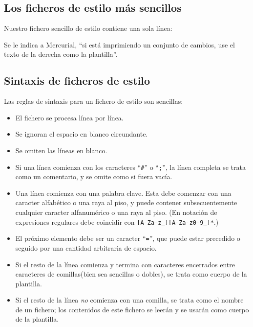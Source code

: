 {{\subsection{Los ficheros de estilo más sencillos}

Nuestro fichero sencillo de estilo contiene una sola línea:


Se le indica a Mercurial, ``si está imprimiendo un conjunto de
cambios, use el texto de la derecha como la plantilla''.

\subsection{Sintaxis de ficheros de estilo}

Las reglas de sintaxis para un fichero de estilo son sencillas:

\begin{itemize}
\item El fichero se procesa línea por línea.

\item Se ignoran el espacio en blanco circundante.

\item Se omiten las líneas en blanco.

\item Si una línea comienza con los caracteres ``\texttt{\#}'' o
  ``\texttt{;}'', la línea completa se trata como un comentario, y se
  omite como si fuera vacía.

\item Una línea comienza con una palabra clave.  Esta debe comenzar
  con una caracter alfabético o una raya al piso, y puede contener
  subsecuentemente cualquier caracter alfanumérico o una raya al
  piso.  (En notación de expresiones regulares debe coincidir con
  \Verb+[A-Za-z_][A-Za-z0-9_]*+.)

\item El próximo elemento debe ser un caracter ``\texttt{=}'', que
  puede estar precedido o seguido por una cantidad arbitraria de
  espacio.

\item Si el resto de la línea comienza y termina con caracteres
  encerrados entre caracteres de comillas(bien sea sencillas o
  dobles),  se trata como cuerpo de la plantilla.

\item Si el resto de la línea \emph{no} comienza con una comilla, se
  trata como el nombre de un fichero; los contenidos de este fichero
  se leerán y se usarán como cuerpo de la plantilla.
\end{itemize}

}}
